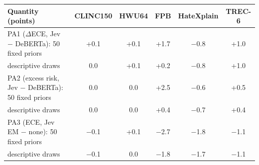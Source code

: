 \begin{tabular}{lccccc}
\toprule
Quantity (points) & CLINC150 & HWU64 & FPB & HateXplain & TREC-6 \\
\midrule
PA1 ($\Delta$ECE, Jev $-$ DeBERTa): 50 fixed priors & +0.1 & +0.1 & +1.7 & $-$0.8 & +1.0 \\
\quad 200 descriptive draws &0.0 & +0.1 & +0.2 & $-$0.8 & +1.0 \\
PA2 (excess risk, Jev $-$ DeBERTa): 50 fixed priors & 0.0 & 0.0 & +2.5 & $-$0.6 & +0.5 \\
\quad 200 descriptive draws &0.0 & 0.0 & +0.4 & $-$0.7 & +0.4 \\
PA3 (ECE, Jev EM $-$ none): 50 fixed priors & $-$0.1 & +0.1 & $-$2.7 & $-$1.8 & $-$1.1 \\
\quad 200 descriptive draws &$-$0.1 & 0.0 & $-$1.8 & $-$1.7 & $-$1.1 \\
\bottomrule
\end{tabular}
